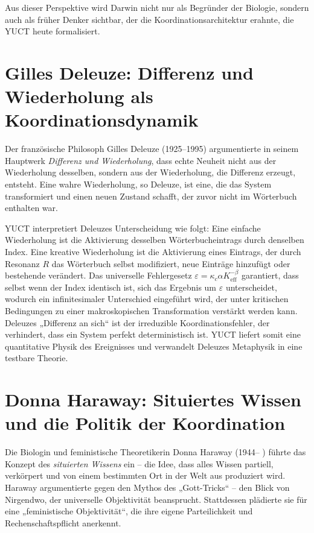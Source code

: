 \documentclass[12pt,a4paper]{article}
\begin{document}
	Aus dieser Perspektive wird Darwin nicht nur als Begründer der Biologie, sondern auch als früher Denker sichtbar, der die Koordinationsarchitektur erahnte, die YUCT heute formalisiert.
	
	\section{Gilles Deleuze: Differenz und Wiederholung als Koordinationsdynamik}
	
	Der französische Philosoph Gilles Deleuze (1925–1995) argumentierte in seinem Hauptwerk \emph{Differenz und Wiederholung}, dass echte Neuheit nicht aus der Wiederholung desselben, sondern aus der Wiederholung, die Differenz erzeugt, entsteht. Eine wahre Wiederholung, so Deleuze, ist eine, die das System transformiert und einen neuen Zustand schafft, der zuvor nicht im Wörterbuch enthalten war.
	
	YUCT interpretiert Deleuzes Unterscheidung wie folgt: Eine einfache Wiederholung ist die Aktivierung desselben Wörterbucheintrags durch denselben Index. Eine kreative Wiederholung ist die Aktivierung eines Eintrags, der durch Resonanz \(R\) das Wörterbuch selbst modifiziert, neue Einträge hinzufügt oder bestehende verändert. Das universelle Fehlergesetz \(\varepsilon = \kappa_c \alpha K_{\mathrm{eff}}^{-\beta}\) garantiert, dass selbst wenn der Index identisch ist, sich das Ergebnis um \(\varepsilon\) unterscheidet, wodurch ein infinitesimaler Unterschied eingeführt wird, der unter kritischen Bedingungen zu einer makroskopischen Transformation verstärkt werden kann. Deleuzes „Differenz an sich“ ist der irreduzible Koordinationsfehler, der verhindert, dass ein System perfekt deterministisch ist. YUCT liefert somit eine quantitative Physik des Ereignisses und verwandelt Deleuzes Metaphysik in eine testbare Theorie.
	
	\section{Donna Haraway: Situiertes Wissen und die Politik der Koordination}
	
	Die Biologin und feministische Theoretikerin Donna Haraway (1944– ) führte das Konzept des \emph{situierten Wissens} ein – die Idee, dass alles Wissen partiell, verkörpert und von einem bestimmten Ort in der Welt aus produziert wird. Haraway argumentierte gegen den Mythos des „Gott-Tricks“ – den Blick von Nirgendwo, der universelle Objektivität beansprucht. Stattdessen plädierte sie für eine „feministische Objektivität“, die ihre eigene Parteilichkeit und Rechenschaftspflicht anerkennt.
	
\end{document}
